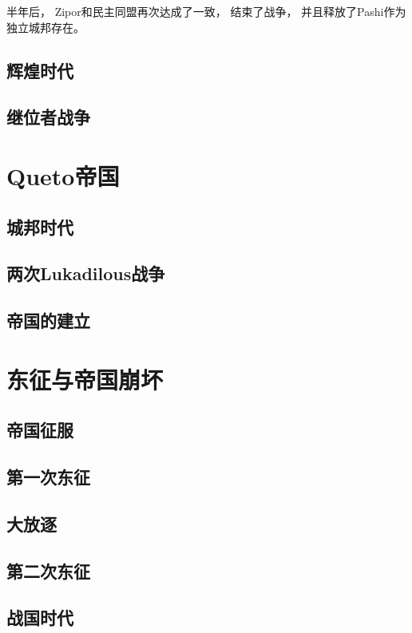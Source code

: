 \documentclass[UTF8,12pt]{ctexbook}
\begin{document}
            半年后，
            Zipor和民主同盟再次达成了一致，
            结束了战争，
            并且释放了Pashi作为独立城邦存在。
            \subsection{辉煌时代}
            \subsection{继位者战争}
        \section{Queto帝国}
            \subsection{城邦时代}

            \subsection{两次Lukadilous战争}

            \subsection{帝国的建立}

        \section{东征与帝国崩坏}
            \subsection{帝国征服}

            \subsection{第一次东征}

            \subsection{大放逐}

            \subsection{第二次东征}

            \subsection{战国时代}
\end{document}
